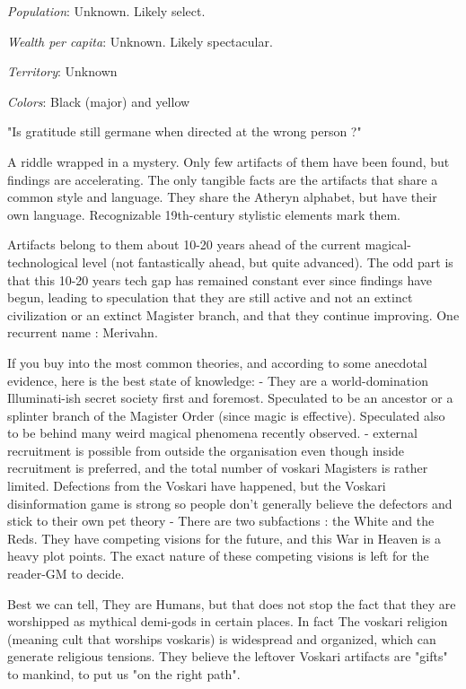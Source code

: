 \textit{Population}: Unknown. Likely select.

\textit{Wealth per capita}: Unknown. Likely spectacular.

\textit{Territory}: Unknown
    
\textit{Colors}: Black (major) and yellow


\begin{rpg-quotebox}
	"Is gratitude still germane when directed at the wrong person ?"
\end{rpg-quotebox}

A riddle wrapped in a mystery. Only few artifacts of them have been found, but findings are accelerating. The only tangible facts are the artifacts that share a common style and language. They share the Atheryn alphabet, but have their own language. Recognizable 19th-century stylistic elements mark them.

Artifacts belong to them about 10-20 years ahead of the current magical-technological level (not fantastically ahead, but quite advanced). The odd part is that this 10-20 years tech gap has remained constant ever since findings have begun, leading to speculation that they are still active and not an extinct civilization or an extinct Magister branch, and that they continue improving. One recurrent name : Merivahn.


If you buy into the most common theories, and according to some anecdotal evidence, here is the best state of knowledge: 
    - They are a world-domination Illuminati-ish secret society first and foremost. Speculated to be an ancestor or a splinter branch of the Magister Order (since magic is effective). Speculated also to be behind many weird magical phenomena recently observed.
    - external recruitment is possible from outside the organisation even though inside recruitment is preferred, and the total number of voskari Magisters is rather limited. Defections from the Voskari have happened, but the Voskari disinformation game is strong so people don't generally believe the defectors and stick to their own pet theory
    - There are two subfactions : the White and the Reds. They have competing visions for the future, and this War in Heaven is a heavy plot points. The exact nature of these competing visions is left for the reader-GM to decide.

Best we can tell, They are Humans, but that does not stop the fact that they are worshipped as mythical demi-gods in certain places. In fact The voskari religion (meaning cult that worships voskaris) is widespread and organized, which can generate religious tensions. They believe the leftover Voskari artifacts are "gifts" to mankind, to put us "on the right path". 


